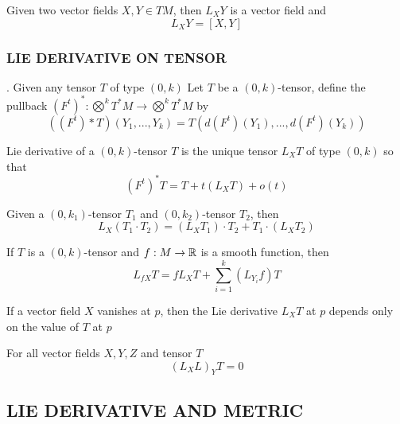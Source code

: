 \begin{proposition}
	Given two vector fields $X, Y \in TM$, then $L_X Y$ is a vector field and
	$$
		L_X Y = [X, Y]
	$$
\end{proposition}

\subsubsection{LIE DERIVATIVE ON TENSOR}

. Given any tensor $T$ of type $(0, k)$
Let $T$ be a $(0, k)$-tensor, define the pullback $(F^t)^*: \bigotimes^k T^* M \to \bigotimes^k T^* M$ by
$$
	((F^t)* T)(Y_1, ..., Y_k) = T(d(F^t)(Y_1), ..., d(F^t)(Y_k))
$$

\begin{definition}
	Lie derivative of a $(0, k)$-tensor $T$ is the unique tensor $L_X T$ of type $(0, k)$ so that
	$$
		(F^t)^* T = T + t(L_X T) + o(t)
	$$
\end{definition}

\begin{proposition}
	Given a $(0, k_1)$-tensor $T_1$ and $(0, k_2)$-tensor $T_2$, then
	$$
		L_X(T_1 \cdot T_2) = (L_X T_1) \cdot T_2 + T_1 \cdot (L_X T_2)
	$$
\end{proposition}

\begin{proposition}
	If $T$ is a $(0, k)$-tensor and $f: M \to \mathbb{R}$ is a smooth function, then
	$$
		L_{fX} T = f L_X T + \sum_{i=1}^k (L_{Y_i} f) T
	$$
\end{proposition}

\begin{lemma}
	If a vector field $X$ vanishes at $p$, then the Lie derivative $L_X T$ at $p$ depends only on the value of $T$ at $p$
\end{lemma}

\begin{proposition}
	For all vector fields $X, Y, Z$ and tensor $T$
	$$
		(L_X L)_Y T = 0
	$$
	
\end{proposition}

\subsection{LIE DERIVATIVE AND METRIC}
